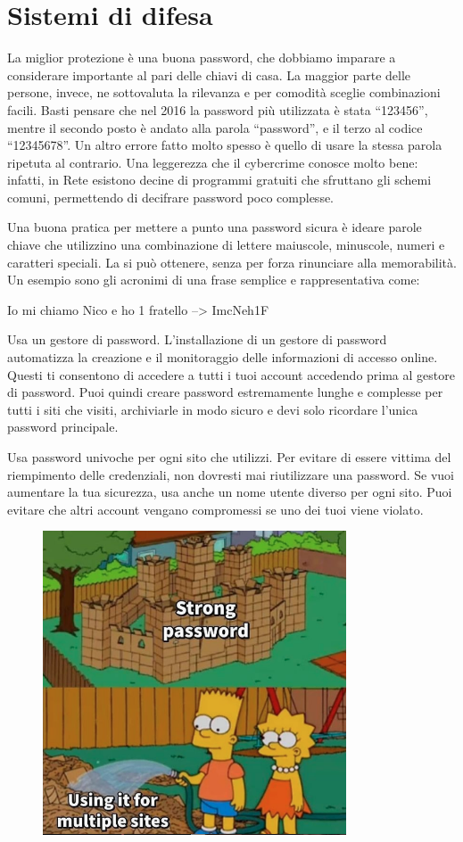 \section{Sistemi di difesa}

La miglior protezione è una buona password, che dobbiamo imparare a considerare importante al pari delle chiavi di casa. La maggior parte delle persone, invece, ne sottovaluta la rilevanza e per comodità sceglie combinazioni facili. Basti pensare che nel 2016 la password più utilizzata è stata “123456”, mentre il secondo posto è andato alla parola “password”, e il terzo al codice “12345678”. Un altro errore fatto molto spesso è quello di usare la stessa parola ripetuta al contrario. Una leggerezza che il cybercrime conosce molto bene: infatti, in Rete esistono decine di programmi gratuiti che sfruttano gli schemi comuni, permettendo di decifrare password poco complesse.

Una buona pratica per mettere a punto una password sicura è ideare parole chiave che utilizzino una combinazione di lettere maiuscole, minuscole, numeri e caratteri speciali. La si può ottenere, senza per forza rinunciare alla memorabilità. Un esempio sono gli acronimi di una frase semplice e rappresentativa come:

\medskip

Io mi chiamo Nico e ho 1 fratello  -->  ImcNeh1F

\medskip

Usa un gestore di password. L'installazione di un gestore di password automatizza la creazione e il monitoraggio delle informazioni di accesso online. Questi ti consentono di accedere a tutti i tuoi account accedendo prima al gestore di password. Puoi quindi creare password estremamente lunghe e complesse per tutti i siti che visiti, archiviarle in modo sicuro e devi solo ricordare l'unica password principale.

Usa password univoche per ogni sito che utilizzi. Per evitare di essere vittima del riempimento delle credenziali, non dovresti mai riutilizzare una password. Se vuoi aumentare la tua sicurezza, usa anche un nome utente diverso per ogni sito. Puoi evitare che altri account vengano compromessi se uno dei tuoi viene violato.
\begin{figure}[ht]
    \centering
    \includegraphics[width=90mm]{Immagini/9/simpson.png}
\end{figure}

